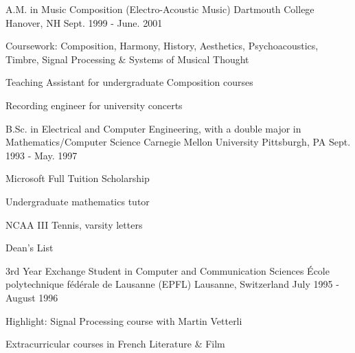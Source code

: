 

\begin{cventries}

  \cventry
    {A.M. in Music Composition (Electro-Acoustic Music)} %
    {Dartmouth College} %
    {Hanover, NH} %
    {Sept. 1999 - June. 2001} %
    {
      \begin{cvitems} %
        \item {Coursework: Composition, Harmony, History, Aesthetics, Psychoacoustics, Timbre, Signal Processing \& Systems of Musical Thought}
        \item {Teaching Assistant for undergraduate Composition courses}
        \item {Recording engineer for university concerts}
      \end{cvitems}
    }

  \cventry
    {B.Sc. in Electrical and Computer Engineering, with a double major in Mathematics/Computer Science} %
    {Carnegie Mellon University} %
    {Pittsburgh, PA} %
    {Sept. 1993 - May. 1997} %
    {
      \begin{cvitems} %
        \item {Microsoft Full Tuition Scholarship}
        \item {Undergraduate mathematics tutor}
        \item {NCAA III Tennis, varsity letters}
        \item {Dean's List}
      \end{cvitems}
    }
    
  \cventry
    {3rd Year Exchange Student in Computer and Communication Sciences} %
    {{\'E}cole polytechnique f{\'e}d{\'e}rale de Lausanne (EPFL)} %
    {Lausanne, Switzerland} %
    {July 1995 - August 1996} %
    {
      \begin{cvitems} %
        \item {Highlight: Signal Processing course with Martin Vetterli}
        \item {Extracurricular courses in French Literature \& Film}
      \end{cvitems}
    }
    
\end{cventries}

